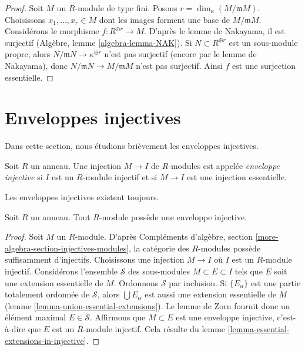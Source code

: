 \begin{proof}
Soit $M$ un $R$-module de type fini. Posons $r = \dim_\kappa(M/\mathfrak m M)$.
Choisissons $x_1, \ldots, x_r \in M$ dont les images forment une base de $M/\mathfrak m M$.
Considérons le morphisme $f : R^{\oplus r} \to M$. D'après le lemme de Nakayama, il est
surjectif (Algèbre, lemme \ref{algebra-lemma-NAK}). Si $N \subset R^{\oplus r}$ est un sous-module propre,
alors $N/\mathfrak m N \to \kappa^{\oplus r}$ n'est pas surjectif (encore par le lemme de Nakayama),
donc $N/\mathfrak m N \to M/\mathfrak m M$ n'est pas surjectif.
Ainsi $f$ est une surjection essentielle.
\end{proof}







\section{Enveloppes injectives}
\label{section-injective-hull}

\noindent
Dans cette section, nous étudions brièvement les enveloppes injectives.

\begin{definition}
\label{definition-injective-hull}
Soit $R$ un anneau. Une injection $M \to I$ de $R$-modules est appelée
{\it enveloppe injective} si $I$ est un $R$-module injectif
et si $M \to I$ est une injection essentielle.
\end{definition}

\noindent
Les enveloppes injectives existent toujours.

\begin{lemma}
\label{lemma-injective-hull}
Soit $R$ un anneau. Tout $R$-module possède une enveloppe injective.
\end{lemma}

\begin{proof}
Soit $M$ un $R$-module. D'après Compléments d'algèbre, section \ref{more-algebra-section-injectives-modules},
la catégorie des $R$-modules possède suffisamment d'injectifs.
Choisissons une injection $M \to I$ où $I$ est un $R$-module injectif.
Considérons l'ensemble $\mathcal{S}$ des sous-modules $M \subset E \subset I$
tels que $E$ soit une extension essentielle de $M$.
Ordonnons $\mathcal{S}$ par inclusion. Si $\{E_\alpha\}$ est une partie totalement
ordonnée de $\mathcal{S}$, alors $\bigcup E_\alpha$ est aussi une extension essentielle
de $M$ (lemme \ref{lemma-union-essential-extensions}).
Le lemme de Zorn fournit donc un élément maximal $E \in \mathcal{S}$.
Affirmons que $M \subset E$ est une enveloppe injective, c'est-à-dire
que $E$ est un $R$-module injectif. Cela résulte du lemme \ref{lemma-essential-extensions-in-injective}.
\end{proof}

